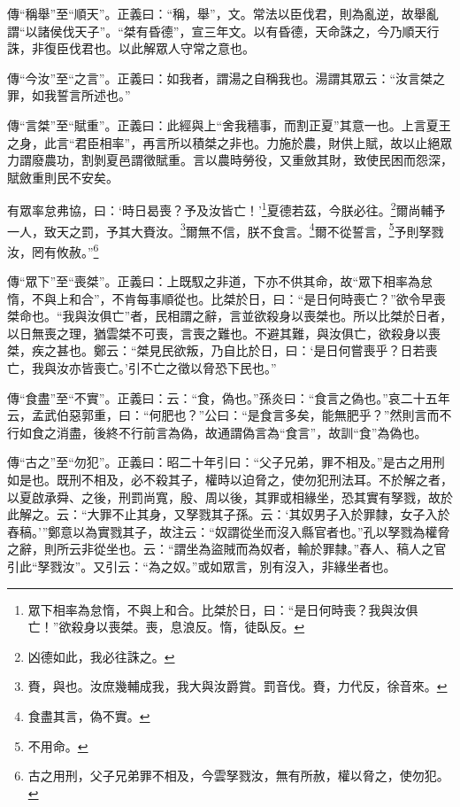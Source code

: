 {\noindent\zhuan{}\fzbyks 傳“稱舉”至“順天”。正義曰：“稱，舉”，文。常法以臣伐君，則為亂逆，故舉亂謂“以諸侯伐天子”。“桀有昏德”，宣三年文。以有昏德，天命誅之，今乃順天行誅，非復臣伐君也。以此解眾人守常之意也。 \par}

{\noindent\zhuan{}\fzbyks 傳“今汝”至“之言”。正義曰：如我者，謂湯之自稱我也。湯謂其眾云：“汝言桀之罪，如我誓言所述也。” \par}

{\noindent\zhuan{}\fzbyks 傳“言桀”至“賦重”。正義曰：此經與上“舍我穡事，而割正夏”其意一也。上言夏王之身，此言“君臣相率”，再言所以積桀之非也。力施於農，財供上賦，故以止絕眾力謂廢農功，割剝夏邑謂徵賦重。言以農時勞役，又重斂其財，致使民困而怨深，賦斂重則民不安矣。 \par}

有眾率怠弗協，曰：‘時日曷喪？予及汝皆亡！’\footnote{眾下相率為怠惰，不與上和合。比桀於日，曰：“是日何時喪？我與汝俱亡！”欲殺身以喪桀。喪，息浪反。惰，徒臥反。}夏德若茲，今朕必往。\footnote{凶德如此，我必往誅之。}爾尚輔予一人，致天之罰，予其大賚汝。\footnote{賚，與也。汝庶幾輔成我，我大與汝爵賞。罰音伐。賚，力代反，徐音來。}爾無不信，朕不食言。\footnote{食盡其言，偽不實。}爾不從誓言，\footnote{不用命。}予則孥戮汝，罔有攸赦。”\footnote{古之用刑，父子兄弟罪不相及，今雲孥戮汝，無有所赦，權以脅之，使勿犯。}

{\noindent\zhuan{}\fzbyks 傳“眾下”至“喪桀”。正義曰：上既馭之非道，下亦不供其命，故“眾下相率為怠惰，不與上和合”，不肯每事順從也。比桀於日，曰：“是日何時喪亡？”欲令早喪桀命也。“我與汝俱亡”者，民相謂之辭，言並欲殺身以喪桀也。所以比桀於日者，以日無喪之理，猶雲桀不可喪，言喪之難也。不避其難，與汝俱亡，欲殺身以喪桀，疾之甚也。鄭云：“桀見民欲叛，乃自比於日，曰：‘是日何嘗喪乎？日若喪亡，我與汝亦皆喪亡。’引不亡之徵以脅恐下民也。” \par}

{\noindent\zhuan{}\fzbyks 傳“食盡”至“不實”。正義曰：云：“食，偽也。”孫炎曰：“食言之偽也。”哀二十五年云，孟武伯惡郭重，曰：“何肥也？”公曰：“是食言多矣，能無肥乎？”然則言而不行如食之消盡，後終不行前言為偽，故通謂偽言為“食言”，故訓“食”為偽也。 \par}

{\noindent\zhuan{}\fzbyks 傳“古之”至“勿犯”。正義曰：昭二十年引曰：“父子兄弟，罪不相及。”是古之用刑如是也。既刑不相及，必不殺其子，權時以迫脅之，使勿犯刑法耳。不於解之者，以夏啟承舜、之後，刑罰尚寬，殷、周以後，其罪或相緣坐，恐其實有孥戮，故於此解之。云：“大罪不止其身，又孥戮其子孫。云：‘其奴男子入於罪隸，女子入於舂稿。’”鄭意以為實戮其子，故注云：“奴謂從坐而沒入縣官者也。”孔以孥戮為權脅之辭，則所云非從坐也。云：“謂坐為盜賊而為奴者，輸於罪隸。”舂人、稿人之官引此“孥戮汝”。又引云：“為之奴。”或如眾言，別有沒入，非緣坐者也。 \par}

